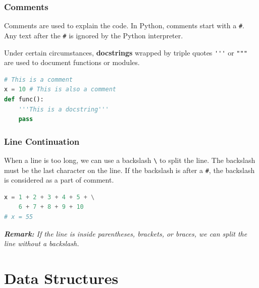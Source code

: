 \documentclass[beamer, en, version=2.0]{huangfusl-template}
\begin{document}
    \begin{frame}[fragile]
        \frametitle{Comments}

        Comments are used to explain the code. In Python, comments start with a {\footnotesize\verb|#|}. Any text after the {\footnotesize\verb|#|} is ignored by the Python interpreter.

        Under certain circumstances, \textbf{docstrings} wrapped by triple quotes {\footnotesize\verb|'''|} or {\footnotesize\verb|"""|} are used to document functions or modules.

\begin{lstlisting}[language=python]
# This is a comment
x = 10 # This is also a comment
def func():
    '''This is a docstring'''
    pass
\end{lstlisting}
    \end{frame}
    \begin{frame}[fragile]
        \frametitle{Line Continuation}

        When a line is too long, we can use a backslash {\footnotesize\verb|\|} to split the line. The backslash must be the last character on the line. If the backslash is after a {\footnotesize\verb|#|}, the backslash is considered as a part of comment.

\begin{lstlisting}[language=python]
x = 1 + 2 + 3 + 4 + 5 + \
    6 + 7 + 8 + 9 + 10
# x = 55
\end{lstlisting}

        {\footnotesize\itshape\textbf{Remark:} If the line is inside parentheses, brackets, or braces, we can split the line without a backslash.}
    \end{frame}
    \section{Data Structures}
\end{document}
